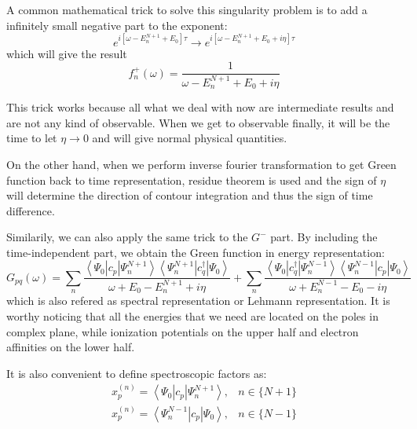 A common mathematical trick to solve this singularity problem is to add a infinitely small negative part to the exponent:
\begin{equation}
e^{i\left[\omega-E_{n}^{N+1}+E_{0}\right] \tau} \rightarrow e^{i\left[\omega-E_{n}^{N+1}+E_{0}+i\eta\right] \tau}
\end{equation}
which will give the result
\begin{equation}
f_{n}^{+}(\omega)=\frac{1}{\omega-E_{n}^{N+1}+E_{0}+i \eta}
\end{equation}

This trick works because all what we deal with now are intermediate results and are not any kind of observable.
When we get to observable finally, it will be the time to let $\eta \rightarrow 0$ and will give normal physical quantities.

On the other hand, when we perform inverse fourier transformation to get Green function back to time representation, residue theorem is used and the sign of $\eta$ will determine the direction of contour integration and thus the sign of time difference.

Similarily, we can also apply the same trick to the $G^{-}$ part.
By including the time-independent part, we obtain the Green function in energy representation:
\begin{equation} \label{spectralrepresentation}
G_{p q}(\omega)=\sum_{n} \frac{\left\langle\Psi_{0}\left|c_{p}\right| \Psi_{n}^{N+1}\right\rangle\left\langle\Psi_{n}^{N+1}\left|c_{q}^{\dagger}\right| \Psi_{0}\right\rangle}{\omega+E_{0}-E_{n}^{N+1}+i \eta}+\sum_{n} \frac{\left\langle\Psi_{0}\left|c_{q}^{\dagger}\right| \Psi_{n}^{N-1}\right\rangle\left\langle\Psi_{n}^{N-1}\left|c_{p}\right| \Psi_{0}\right\rangle}{\omega+E_{n}^{N-1}-E_{0}-i \eta}
\end{equation}
which is also refered as spectral representation or Lehmann representation.
It is worthy noticing that all the energies that we need are located on the poles in complex plane, while ionization potentials on the upper half and electron affinities on the lower half.

It is also convenient to define spectroscopic factors as:
\begin{equation}
\begin{array}{ll}{x_{p}^{(n)}=\left\langle\Psi_{0}\left|c_{p}\right| \Psi_{n}^{N+1}\right\rangle,} & { n \in\{N+1\}} \\ {x_{p}^{(n)}=\left\langle\Psi_{n}^{N-1}\left|c_{p}\right| \Psi_{0}\right\rangle,} & { n \in\{N-1\}}\end{array}
\end{equation}

